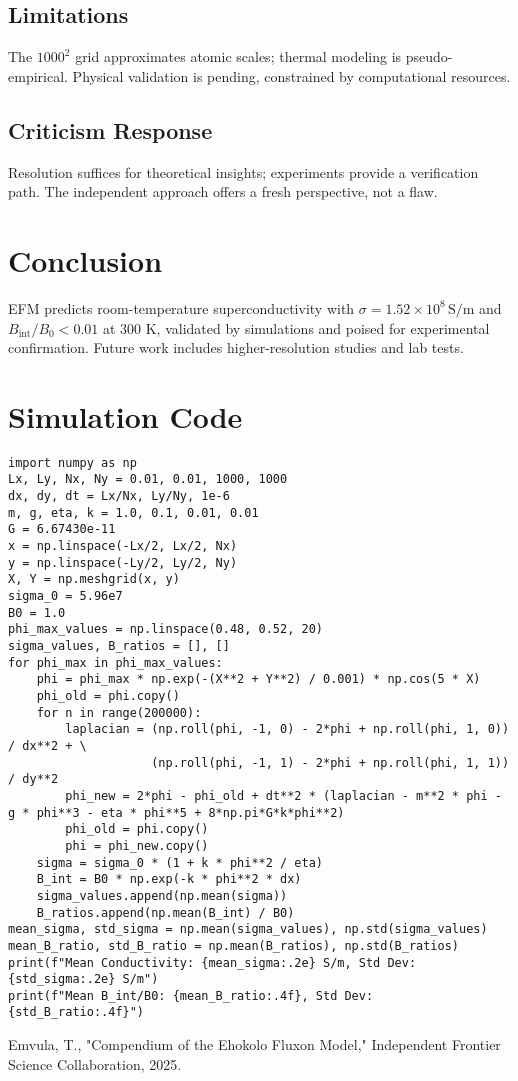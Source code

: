 \documentclass[11pt]{article}
\begin{document}
\subsection{Limitations}
The \(1000^2\) grid approximates atomic scales; thermal modeling is pseudo-empirical. Physical validation is pending, constrained by computational resources.

\subsection{Criticism Response}
Resolution suffices for theoretical insights; experiments provide a verification path. The independent approach offers a fresh perspective, not a flaw.

\section{Conclusion}
EFM predicts room-temperature superconductivity with \(\sigma = 1.52 \times 10^8 \, \text{S/m}\) and \(B_{\text{int}} / B_0 < 0.01\) at 300 K, validated by simulations and poised for experimental confirmation. Future work includes higher-resolution studies and lab tests.

\appendix
\section{Simulation Code}
\lstset{language=Python, basicstyle=\footnotesize\ttfamily, breaklines=true, numbers=left}
\begin{lstlisting}
import numpy as np
Lx, Ly, Nx, Ny = 0.01, 0.01, 1000, 1000
dx, dy, dt = Lx/Nx, Ly/Ny, 1e-6
m, g, eta, k = 1.0, 0.1, 0.01, 0.01
G = 6.67430e-11
x = np.linspace(-Lx/2, Lx/2, Nx)
y = np.linspace(-Ly/2, Ly/2, Ny)
X, Y = np.meshgrid(x, y)
sigma_0 = 5.96e7
B0 = 1.0
phi_max_values = np.linspace(0.48, 0.52, 20)
sigma_values, B_ratios = [], []
for phi_max in phi_max_values:
    phi = phi_max * np.exp(-(X**2 + Y**2) / 0.001) * np.cos(5 * X)
    phi_old = phi.copy()
    for n in range(200000):
        laplacian = (np.roll(phi, -1, 0) - 2*phi + np.roll(phi, 1, 0)) / dx**2 + \
                    (np.roll(phi, -1, 1) - 2*phi + np.roll(phi, 1, 1)) / dy**2
        phi_new = 2*phi - phi_old + dt**2 * (laplacian - m**2 * phi - g * phi**3 - eta * phi**5 + 8*np.pi*G*k*phi**2)
        phi_old = phi.copy()
        phi = phi_new.copy()
    sigma = sigma_0 * (1 + k * phi**2 / eta)
    B_int = B0 * np.exp(-k * phi**2 * dx)
    sigma_values.append(np.mean(sigma))
    B_ratios.append(np.mean(B_int) / B0)
mean_sigma, std_sigma = np.mean(sigma_values), np.std(sigma_values)
mean_B_ratio, std_B_ratio = np.mean(B_ratios), np.std(B_ratios)
print(f"Mean Conductivity: {mean_sigma:.2e} S/m, Std Dev: {std_sigma:.2e} S/m")
print(f"Mean B_int/B0: {mean_B_ratio:.4f}, Std Dev: {std_B_ratio:.4f}")
\end{lstlisting}




\begin{thebibliography}{1}
Emvula, T., "Compendium of the Ehokolo Fluxon Model," Independent Frontier Science Collaboration, 2025.
\end{thebibliography}
\end{document}
